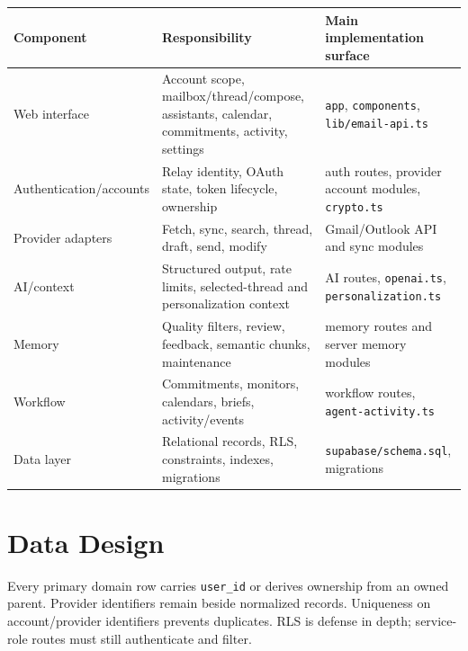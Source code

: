 \documentclass[11pt]{article}
\begin{document}
\begin{longtable}{@{}p{}p{}p{}@{}}
\toprule
Component & Responsibility & Main implementation surface \\
\midrule
\endhead
\bottomrule
\endlastfoot
Web interface & Account scope, mailbox/thread/compose, assistants, calendar, commitments, activity, settings & \texttt{app}, \texttt{components}, \texttt{lib/email-api.ts} \\
Authentication/accounts & Relay identity, OAuth state, token lifecycle, ownership & auth routes, provider account modules, \texttt{crypto.ts} \\
Provider adapters & Fetch, sync, search, thread, draft, send, modify & Gmail/Outlook API and sync modules \\
AI/context & Structured output, rate limits, selected-thread and personalization context & AI routes, \texttt{openai.ts}, \texttt{personalization.ts} \\
Memory & Quality filters, review, feedback, semantic chunks, maintenance & memory routes and server memory modules \\
Workflow & Commitments, monitors, calendars, briefs, activity/events & workflow routes, \texttt{agent-activity.ts} \\
Data layer & Relational records, RLS, constraints, indexes, migrations & \texttt{supabase/schema.sql}, migrations \\
\end{longtable}

\section{Data Design}

Every primary domain row carries \texttt{user\_id} or derives ownership from an
owned parent. Provider identifiers remain beside normalized records. Uniqueness
on account/provider identifiers prevents duplicates. RLS is defense in depth;
service-role routes must still authenticate and filter.
\end{document}
